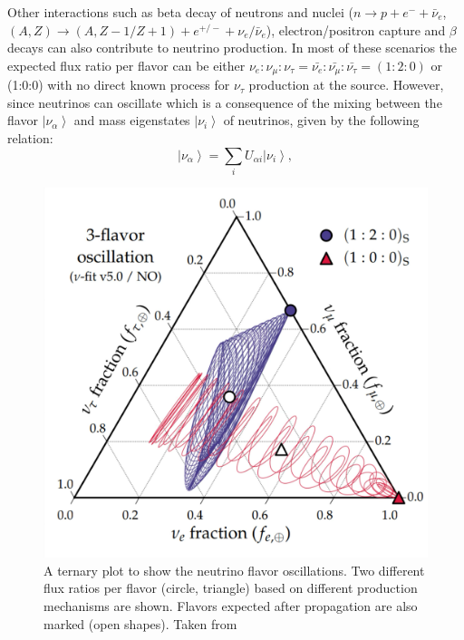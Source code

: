 Other interactions such as beta decay of neutrons and nuclei ($n \longrightarrow p + e^- + \bar{\nu}_{e} $, \\$(A, Z) \longrightarrow (A, Z-1/ Z+1) + e^{+/-} + \nu_{e} / \bar{\nu}_{e}$), electron/positron capture and $\beta$ decays can also contribute to neutrino production. In most of these scenarios the expected flux ratio per flavor can be either $ \nu_{e} : \nu_{\mu} : \nu_{\tau} = \bar{\nu_{e}}: \bar{\nu_{\mu}}: \bar{\nu_{\tau}} = (1:2:0) $ or (1:0:0) with no direct known process for $\nu_{\tau}$ production at the source. However, since neutrinos can oscillate which is a consequence of the mixing between the flavor  $\left| \nu_{\alpha} \right\rangle $ and mass eigenstates $\left| \nu_{i} \right\rangle $  of neutrinos, given by the following relation:
\begin{equation}
\left| \nu_{\alpha} \right\rangle  = \sum_i U_{\alpha i} \left| \nu_{i} \right\rangle,
\end{equation}
\begin{figure}[t!]
  \centering
  \includegraphics[width=12.5cm]{thesis_figures/CRnNu/Oscillation_sim_ternary.pdf}
  \caption{A ternary plot to show the neutrino flavor oscillations. Two different flux ratios per flavor (circle, triangle) based on different production mechanisms are shown. Flavors expected after propagation are also marked (open shapes). Taken from~\cite{Ahlers:ISAPP2022}}
  \label{fig:Oscillation_ternary}
\end{figure}

